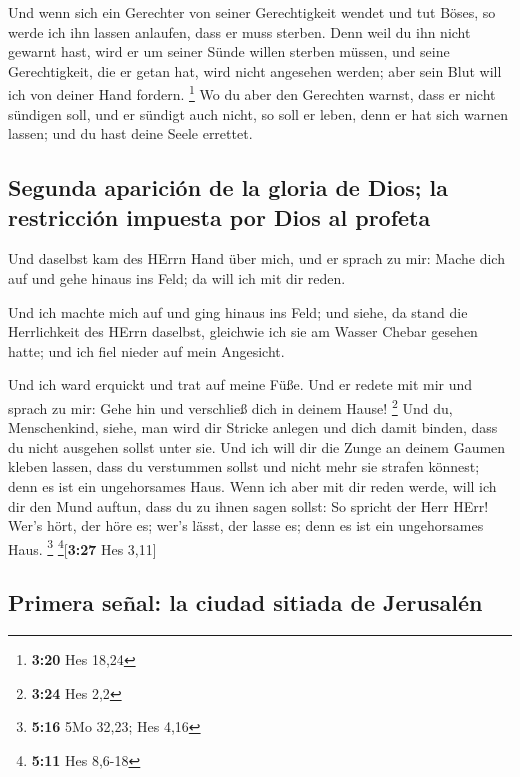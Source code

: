  Und wenn sich ein Gerechter von seiner Gerechtigkeit
wendet und tut Böses, so werde ich ihn lassen anlaufen, dass er muss
sterben. Denn weil du ihn nicht gewarnt hast, wird er um seiner Sünde
willen sterben müssen, und seine Gerechtigkeit, die er getan hat, wird
nicht angesehen werden; aber sein Blut will ich von deiner Hand fordern.
\footnote{\textbf{3:20} Hes 18,24}  Wo du aber den
Gerechten warnst, dass er nicht sündigen soll, und er sündigt auch
nicht, so soll er leben, denn er hat sich warnen lassen; und du hast
deine Seele errettet.

\hypertarget{segunda-apariciuxf3n-de-la-gloria-de-dios-la-restricciuxf3n-impuesta-por-dios-al-profeta}{%
\subsection{Segunda aparición de la gloria de Dios; la restricción
impuesta por Dios al
profeta}\label{segunda-apariciuxf3n-de-la-gloria-de-dios-la-restricciuxf3n-impuesta-por-dios-al-profeta}}

 Und daselbst kam des HErrn Hand über mich, und er sprach
zu mir: Mache dich auf und gehe hinaus ins Feld; da will ich mit dir
reden.

 Und ich machte mich auf und ging hinaus ins Feld; und
siehe, da stand die Herrlichkeit des HErrn daselbst, gleichwie ich sie
am Wasser Chebar gesehen hatte; und ich fiel nieder auf mein Angesicht.

 Und ich ward erquickt und trat auf meine Füße. Und er
redete mit mir und sprach zu mir: Gehe hin und verschließ dich in deinem
Hause! \footnote{\textbf{3:24} Hes 2,2}  Und du,
Menschenkind, siehe, man wird dir Stricke anlegen und dich damit binden,
dass du nicht ausgehen sollst unter sie.  Und ich will
dir die Zunge an deinem Gaumen kleben lassen, dass du verstummen sollst
und nicht mehr sie strafen könnest; denn es ist ein ungehorsames Haus.
 Wenn ich aber mit dir reden werde, will ich dir den Mund
auftun, dass du zu ihnen sagen sollst: So spricht der Herr HErr! Wer's
hört, der höre es; wer's lässt, der lasse es; denn es ist ein
ungehorsames Haus. \footnote{\textbf{5:16} 5Mo 32,23; Hes 4,16}
\footnote{\textbf{5:11} Hes 8,6-18}{[}\textbf{3:27} Hes 3,11{]}

\hypertarget{primera-seuxf1al-la-ciudad-sitiada-de-jerusaluxe9n}{%
\subsection{Primera señal: la ciudad sitiada de
Jerusalén}\label{primera-seuxf1al-la-ciudad-sitiada-de-jerusaluxe9n}}

